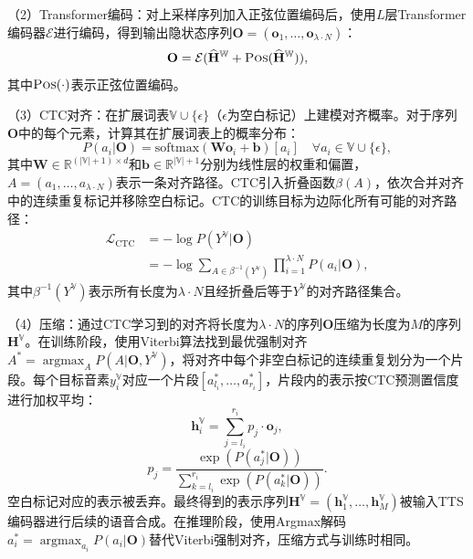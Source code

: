 （2）Transformer编码：对上采样序列加入正弦位置编码后，使用$L$层Transformer编码器$\mathcal{E}$进行编码，得到输出隐状态序列$\mathbf{O} = (\mathbf{o}_1, \ldots, \mathbf{o}_{\lambda \cdot N})$：
\begin{equation}
    \mathbf{O} = \mathcal{E} (\widehat{\mathbf{H}}^{\mathbb{W}} + \text{\textsc{Pos}} (\widehat{\mathbf{H}}^{\mathbb{W}})),
\end{equation}
其中$\text{\textsc{Pos}}(\cdot)$表示正弦位置编码。

（3）CTC对齐：在扩展词表$\mathbb{V}\cup\{\epsilon\}$（$\epsilon$为空白标记）上建模对齐概率。对于序列$\mathbf{O}$中的每个元素，计算其在扩展词表上的概率分布：
\begin{equation}
    P(a_i | \mathbf{O}) = \text{softmax} (\mathbf{W}\mathbf{o}_i + \mathbf{b})[a_i]\quad \forall a_i\in \mathbb{V}\cup\{\epsilon\},
\end{equation}
其中$\mathbf{W}\in\mathbb{R}^{(|\mathbb{V}| + 1)\times d}$和$\mathbf{b}\in\mathbb{R}^{|\mathbb{V}| + 1}$分别为线性层的权重和偏置，$A=(a_1, \ldots, a_{\lambda\cdot N})$表示一条对齐路径。CTC引入折叠函数$\beta(A)$，依次合并对齐中的连续重复标记并移除空白标记。CTC的训练目标为边际化所有可能的对齐路径：
\begin{equation}
\begin{aligned}
    \mathcal{L}_{\text{CTC}} &= -\log P(Y^{\mathbb{V}} | \mathbf{O}) \\
    &= -\log \sum_{A\in\beta^{-1}(Y^{\mathbb{V}})} \prod_{i=1}^{\lambda\cdot N} P(a_i|\mathbf{O}),
\end{aligned}
\end{equation}
其中$\beta^{-1}(Y^{\mathbb{V}})$表示所有长度为$\lambda\cdot N$且经折叠后等于$Y^{\mathbb{V}}$的对齐路径集合。

（4）压缩：通过CTC学习到的对齐将长度为$\lambda\cdot N$的序列$\mathbf{O}$压缩为长度为$M$的序列$\mathbf{H}^{\mathbb{V}}$。在训练阶段，使用Viterbi算法\citep{viterbi}找到最优强制对齐$A^* = \mathop{\arg\max}_{A} P(A|\mathbf{O}, Y^{\mathbb{V}})$，将对齐中每个非空白标记的连续重复划分为一个片段。每个目标音素$y^{\mathbb{V}}_i$对应一个片段$[a^*_{l_i}, \ldots, a^*_{r_i}]$，片段内的表示按CTC预测置信度进行加权平均：
\begin{equation}
    \mathbf{h}^{\mathbb{V}}_i = \sum_{j=l_i}^{r_i} p_j\cdot \mathbf{o}_j,
\end{equation}
\begin{equation}
    p_j = \frac{\exp(P(a^*_j | \mathbf{O}))}{\sum_{k=l_i}^{r_i} \exp(P(a^*_{k} | \mathbf{O}))}.
\end{equation}
空白标记对应的表示被丢弃。最终得到的表示序列$\mathbf{H}^{\mathbb{V}} = (\mathbf{h}^{\mathbb{V}}_1, \ldots, \mathbf{h}^{\mathbb{V}}_M)$被输入TTS编码器进行后续的语音合成。在推理阶段，使用Argmax解码$a^*_i = \mathop{\arg\max}_{a_i} P(a_i | \mathbf{O})$替代Viterbi强制对齐，压缩方式与训练时相同。


